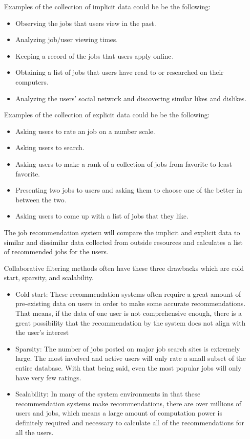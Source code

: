 \documentclass[sigconf]{acmart}
\begin{document}
\par Examples of the collection of implicit data could be be the following:

\begin{itemize}
  \item Observing the jobs that users view in the past.
  \item Analyzing job/user viewing times.
  \item Keeping a record of the jobs that users apply online.
  \item Obtaining a list of jobs that users have read to or researched on their computers.
  \item Analyzing the users' social network and discovering similar likes and dislikes.
\end{itemize}


\par Examples of the collection of explicit data could be be the following:
 
\begin{itemize}
  \item Asking users to rate an job on a number scale.
  \item Asking users to search.
  \item Asking users to make a rank of a collection of jobs from favorite to least favorite.
  \item Presenting two jobs to users and asking them to choose one of the better in between the two.
  \item Asking  users to come up with a list of jobs that they like.
\end{itemize}

\par The job recommendation system will compare the implicit and explicit data to similar and dissimilar data collected from outside resources and calculates a list of recommended jobs for the users. 

\par Collaborative filtering methods often have these three drawbacks which are cold start, sparsity, and scalability.

\begin{itemize}
  \item Cold start: These recommendation systems often require a great amount of pre-existing data on users in order to make some accurate recommendations. That means, if the data of one user is not comprehensive enough, there is a great possibility that the recommendation by the system does not align with the user's interest
  \item Sparsity: The number of jobs posted on major job search sites is extremely large. The most involved and active users will only rate a small subset of the entire database. With that being said, even the most popular jobs will only have very few ratings.
  \item Scalability: In many of the system environments in that these recommendation systems make recommendations, there are over millions of users and jobs, which means a large amount of computation power is definitely required and necessary to calculate all of the recommendations for all the users.

\end{itemize}
\end{document}
